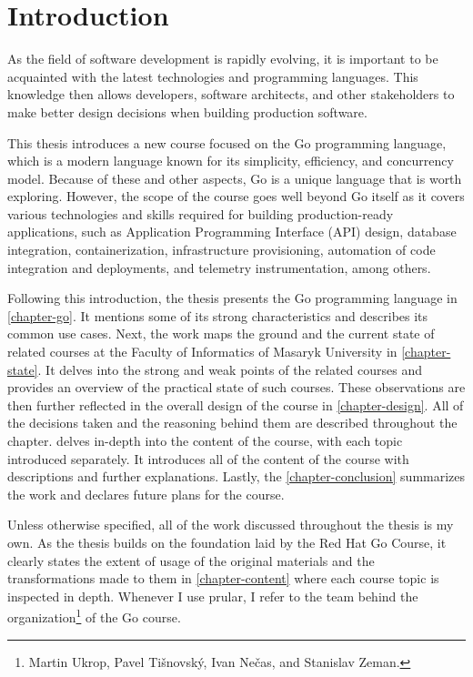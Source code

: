 \documentclass[
  digital,
  color,
  oneside,
  nosansbold,
  nocolorbold,
  nolof,
  nolot,
]{fithesis4}
\begin{document}
\chapter{Introduction}

As the field of software development is rapidly evolving, it is important to be acquainted with the latest technologies and programming languages. This knowledge then allows developers, software architects, and other stakeholders to make better design decisions when building production software.

This thesis introduces a new course focused on the Go\cite{go} programming language, which is a modern language known for its simplicity, efficiency, and concurrency model. Because of these and other aspects, Go is a unique language that is worth exploring. However, the scope of the course goes well beyond Go itself as it covers various technologies and skills required for building production-ready applications, such as Application Programming Interface (API) design, database integration, containerization, infrastructure provisioning, automation of code integration and deployments, and telemetry instrumentation, among others.

Following this introduction, the thesis presents the Go programming language in \cref{chapter-go}. It mentions some of its strong characteristics and describes its common use cases. Next, the work maps the ground and the current state of related courses at the Faculty of Informatics of Masaryk University in \cref{chapter-state}. It delves into the strong and weak points of the related courses and provides an overview of the practical state of such courses. These observations are then further reflected in the overall design of the course in \cref{chapter-design}. All of the decisions taken and the reasoning behind them are described throughout the chapter.  delves in-depth into the content of the course, with each topic introduced separately. It introduces all of the content of the course with descriptions and further explanations. Lastly, the \cref{chapter-conclusion} summarizes the work and declares future plans for the course.

Unless otherwise specified, all of the work discussed throughout the thesis is my own. As the thesis builds on the foundation laid by the Red Hat Go Course\cite{redhat-go-course}, it clearly states the extent of usage of the original materials and the transformations made to them in \cref{chapter-content} where each course topic is inspected in depth. Whenever I use prular, I refer to the team behind the organization\footnote{Martin Ukrop, Pavel Tišnovský, Ivan Nečas, and Stanislav Zeman.} of the Go course.
\end{document}
